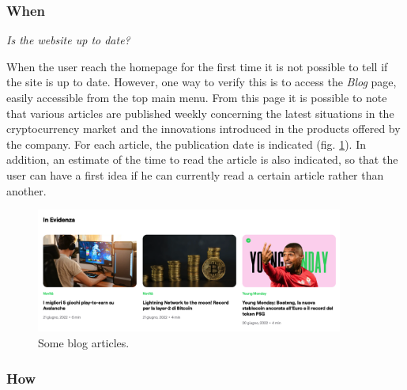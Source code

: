 \subsubsection{When}

\centerline{\textit{Is the website up to date?}}
When the user reach the homepage for the first time it is not possible 
to tell if the site is up to date. However, one way to verify this is to 
access the \textit{Blog} page, easily accessible from the top main menu. 
From this page it is possible to note that various articles are published 
weekly concerning the latest situations in the cryptocurrency market and 
the innovations introduced in the products offered by the company. For 
each article, the publication date is indicated (fig. \ref{fig:blog}). 
In addition, an estimate of the time to read the article is also 
indicated, so that the user can have a first idea if he can currently 
read a certain article rather than another.

\begin{figure}[H]
	\centering
	\includegraphics[width=0.90\textwidth]{res/images/blog-1.png}
	\caption{Some blog articles.}
	\label{fig:blog}
\end{figure}

\subsubsection{How}

